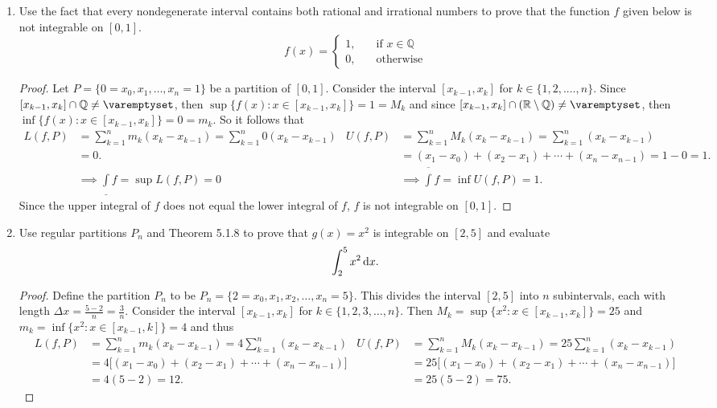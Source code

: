 \documentclass{article}
\begin{document}
\begin{enumerate}
        \item Use the fact that every nondegenerate interval contains both rational and irrational numbers to prove that the function $f$ given below is not integrable on $[0,1]$.
            \[f(x) = 
            \begin{cases}
                1, \quad &\text{if }x \in \mathbb{Q}\\
                0, \quad &\text{otherwise}
            \end{cases}\]
        \begin{proof}
            Let $P = \{0 = x_0,x_1, \ldots,x_n = 1\}$ be a partition of $[0,1]$. Consider the interval $[x_{k-1},x_k]$ for $k \in \{1,2,.\ldots,n\}$. Since $[x_{k-1},x_k] \cap \mathbb{Q} \neq \varemptyset$, then $\sup\{f(x) : x \in [x_{k-1},x_k]\} = 1 = M_k$ and since $[x_{k-1}, x_k] \cap (\mathbb{R} \setminus \mathbb{Q}) \neq \varemptyset$, then $\inf\{f(x) : x \in [x_{k-1},x_k]\} = 0 = m_k$. So it follows that
                \begin{align*}
                    L(f,P) &= \sum_{k=1}^n m_k(x_k-x_{k-1}) = \sum_{k=1}^n 0(x_k-x_{k-1})     &        U(f,P) &= \sum_{k=1}^n M_k(x_k-x_{k-1}) = \sum_{k=1}^n (x_k-x_{k-1})\\
                    &= 0.    &      &= (x_1-x_0)+(x_2-x_1)+\cdots+(x_n-x_{n-1}) = 1-0 = 1.\\
                    &\implies  \underline{\int} f = \sup L(f,P) = 0  &   &\implies \overline{\int} f = \inf U(f,P) = 1.
                \end{align*}
            Since the upper integral of $f$ does not equal the lower integral of $f$, $f$ is not integrable on $[0,1]$.
        \end{proof}
        
        \item Use regular partitions $P_n$ and Theorem 5.1.8 to prove that $g(x) = x^2$ is integrable on $[2,5]$ and evaluate
            \[\int_2^5 x^2 \dif x.\]
        \begin{proof}
            Define the partition $P_n$ to be $P_n = \{2 = x_0,x_1,x_2,\ldots,x_n = 5\}$. This divides the interval $[2,5]$ into $n$ subintervals, each with length $\Delta x = \frac{5-2}{n} = \frac{3}{n}$. Consider the interval $[x_{k-1}, x_k]$ for $k \in \{1,2,3,\ldots,n\}$. Then $M_k = \sup\{x^2 : x \in [x_{k-1},x_k]\} = 25$ and $m_k = \inf\{x^2 : x \in [x_{k-1},k]\} = 4$ and thus
            \begin{align*}
                L(f,P) &= \sum_{k=1}^n m_k(x_k-x_{k-1}) = 4\sum_{k=1}^n (x_k-x_{k-1})     &        U(f,P) &= \sum_{k=1}^n M_k(x_k-x_{k-1}) = 25\sum_{k=1}^n (x_k-x_{k-1})\\
                &= 4\big[(x_1-x_0)+(x_2-x_1)+\cdots+(x_n-x_{n-1})\big]    &      &= 25\big[(x_1-x_0)+(x_2-x_1)+\cdots+(x_n-x_{n-1})\big]\\
                &= 4(5-2) = 12.     &       & = 25(5-2) = 75.
            \end{align*}
        \end{proof}
        

\end{enumerate}
\end{document}
